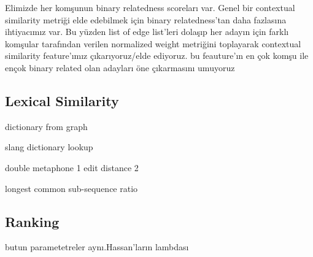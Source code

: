 Elimizde her komşunun binary relatedness scoreları var. Genel bir contextual similarity metriği elde edebilmek için binary relatedness'tan daha fazlasına ihtiyacımız var. Bu yüzden list of edge list'leri dolaşıp her adayın için farklı komşular tarafından verilen normalized weight metriğini toplayarak contextual similarity feature'ımız çıkarıyoruz/elde ediyoruz. bu feauture'ın en çok komşu ile ençok binary related olan adayları öne çıkarmasını umuyoruz

\subsection{Lexical Similarity}

dictionary from graph

slang dictionary lookup

double metaphone 1
edit distance 2


longest common sub-sequence ratio



\subsection{Ranking}

butun parametetreler aynı.Hassan'ların lambdası
